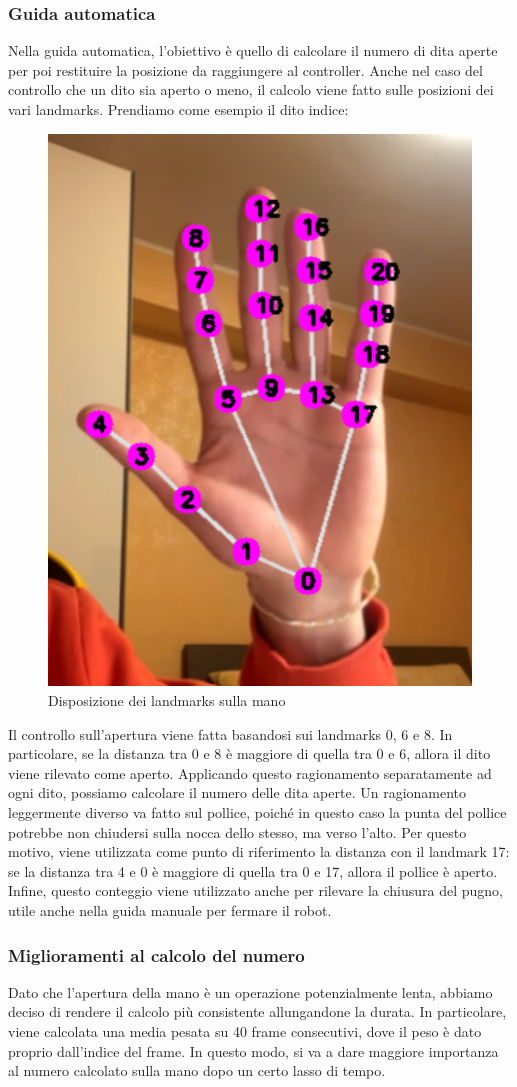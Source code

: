 \documentclass[]{article}
\begin{document}
\subsubsection{Guida automatica}
Nella guida automatica, l'obiettivo è quello di calcolare il numero di dita aperte per poi restituire la posizione da raggiungere al controller. Anche nel caso del controllo che un dito sia aperto o meno, il calcolo viene fatto sulle posizioni dei vari landmarks. Prendiamo come esempio il dito indice:

\begin{figure}[H]
    \centering
    \includegraphics[height=0.6\linewidth]{immagini/mano_aperta.png}
    \caption{Disposizione dei landmarks sulla mano}
\end{figure}

Il controllo sull'apertura viene fatta basandosi sui landmarks 0, 6 e 8. In particolare, se la distanza tra 0 e 8 è maggiore di quella tra 0 e 6, allora il dito viene rilevato come aperto. Applicando questo ragionamento separatamente ad ogni dito, possiamo calcolare il numero delle dita aperte. Un ragionamento leggermente diverso va fatto sul pollice, poiché in questo caso la punta del pollice potrebbe non chiudersi sulla nocca dello stesso, ma verso l'alto. Per questo motivo, viene utilizzata come punto di riferimento la distanza con il landmark 17: se la distanza tra 4 e 0 è maggiore di quella tra 0 e 17, allora il pollice è aperto. Infine, questo conteggio viene utilizzato anche per rilevare la chiusura del pugno, utile anche nella guida manuale per fermare il robot.


\subsubsection*{Miglioramenti al calcolo del numero}
Dato che l'apertura della mano è un operazione potenzialmente lenta, abbiamo deciso di rendere il calcolo più consistente allungandone la durata. In particolare, viene calcolata una media pesata su 40 frame consecutivi, dove il peso è dato proprio dall'indice del frame. In questo modo, si va a dare maggiore importanza al numero calcolato sulla mano dopo un certo lasso di tempo.
\end{document}
